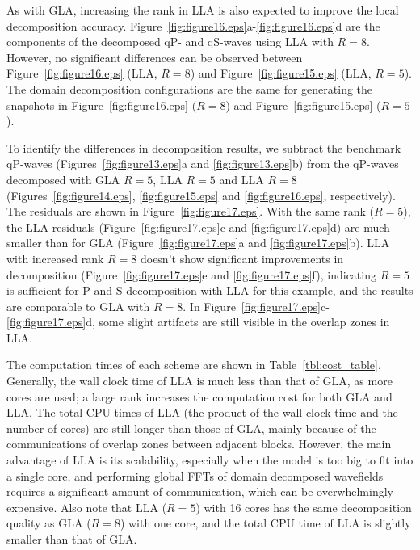 \documentclass[manuscript,ulem,graphix,revised]{geophysics}
\begin{document}
As with GLA, increasing the rank in LLA is also expected to improve the local decomposition accuracy. Figure~\ref{fig:figure16.eps}a-\ref{fig:figure16.eps}d are the components of the decomposed qP- and qS-waves using LLA with $R=8$. However, no significant differences can be observed between Figure~\ref{fig:figure16.eps} (LLA, $R=8$) and Figure~\ref{fig:figure15.eps} (LLA, $R=5$). The domain decomposition configurations are the same for generating the snapshots in Figure~\ref{fig:figure16.eps} ($R=8$) and Figure~\ref{fig:figure15.eps} ($R=5$). 

To identify the differences in decomposition results, we subtract the benchmark qP-waves (Figures~\ref{fig:figure13.eps}a and \ref{fig:figure13.eps}b) from the qP-waves decomposed with GLA $R=5$, LLA $R=5$ and LLA $R=8$ (Figures~\ref{fig:figure14.eps}, \ref{fig:figure15.eps} and \ref{fig:figure16.eps}, respectively). The residuals are shown in Figure~\ref{fig:figure17.eps}.
With the same rank ($R=5$), the LLA residuals (Figure~\ref{fig:figure17.eps}c and \ref{fig:figure17.eps}d) are much smaller than for GLA (Figure~\ref{fig:figure17.eps}a and \ref{fig:figure17.eps}b). LLA with increased rank $R=8$ doesn't show significant improvements in decomposition (Figure~\ref{fig:figure17.eps}e and \ref{fig:figure17.eps}f), indicating $R=5$ is sufficient for P and S decomposition with LLA for this example, and the results are comparable to GLA with $R=8$. In Figure~\ref{fig:figure17.eps}c-\ref{fig:figure17.eps}d, some slight artifacts are still visible in the overlap zones in LLA.  

The computation times of each scheme are shown in Table~\ref{tbl:cost_table}. Generally, the wall clock time of LLA is much less than that of GLA, as more cores are used; a large rank increases the computation cost for both GLA and LLA. The total CPU times of LLA (the product of the wall clock time and the number of cores) are still longer than those of GLA, mainly because of the communications of overlap zones between adjacent blocks. However, the main advantage of LLA is its scalability, especially when the model is too big to fit into a single core, and performing global FFTs of domain decomposed wavefields requires a significant amount of communication, which can be overwhelmingly expensive.
Also note that LLA ($R=5$) with 16 cores has the same decomposition quality as GLA ($R=8$) with one core, and the total CPU time of LLA is slightly smaller than that of GLA.
\end{document}
